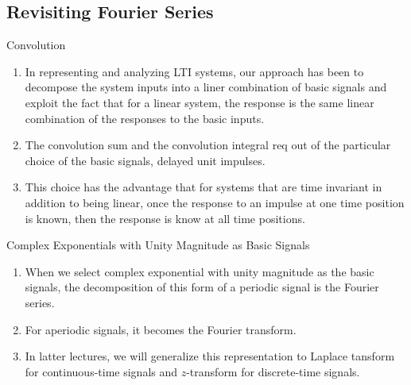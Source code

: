 \subsection{Revisiting Fourier Series}
\begin{frame}{Convolution}
    \begin{enumerate}
      \item In representing and analyzing LTI systems, our approach has been to decompose the system inputs into a liner combination of basic signals and exploit the fact that for a linear system, the response is the same linear combination of the responses to the basic inputs.
      \item The convolution sum and the convolution integral req out of the particular choice of the basic signals, delayed unit impulses.
      \item This choice has the advantage that for systems that are time invariant in addition to being linear, once the response to an impulse at one time position is known, then the response is know at all time positions.
    \end{enumerate}
\end{frame}

\begin{frame}{Complex Exponentials with Unity Magnitude as Basic Signals}
    \begin{enumerate}
      \item When we select complex exponential with unity magnitude as the basic signals, the decomposition of this form of a periodic signal is the Fourier series.
      \item For aperiodic signals, it becomes the Fourier transform.
      \item In latter lectures, we will generalize this representation to Laplace tansform for continuous-time signals and $z$-transform for discrete-time signals.
    \end{enumerate}
\end{frame}

